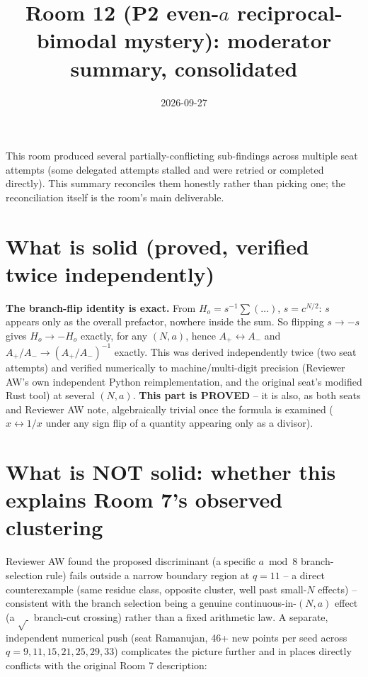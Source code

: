 \documentclass[11pt]{article}
\title{Room 12 (P2 even-$a$ reciprocal-bimodal mystery): moderator summary, consolidated}
\date{2026-09-27}
\begin{document}
\maketitle

\noindent This room produced several partially-conflicting sub-findings across multiple seat
attempts (some delegated attempts stalled and were retried or completed directly). This summary
reconciles them honestly rather than picking one; the reconciliation itself is the room's main
deliverable.

\section*{What is solid (proved, verified twice independently)}

\textbf{The branch-flip identity is exact.} From $H_o=s^{-1}\sum(\ldots)$, $s=c^{N/2}$: $s$
appears only as the overall prefactor, nowhere inside the sum. So flipping $s\to-s$ gives
$H_o\to-H_o$ exactly, for any $(N,a)$, hence $A_+\leftrightarrow A_-$ and
$A_+/A_-\to(A_+/A_-)^{-1}$ exactly. This was derived independently twice (two seat attempts) and
verified numerically to machine/multi-digit precision (Reviewer AW's own independent Python
reimplementation, and the original seat's modified Rust tool) at several $(N,a)$. \textbf{This part
is PROVED} -- it is also, as both seats and Reviewer AW note, algebraically trivial once the formula
is examined ($x\leftrightarrow1/x$ under any sign flip of a quantity appearing only as a divisor).

\section*{What is NOT solid: whether this explains Room 7's observed clustering}

Reviewer AW found the proposed discriminant (a specific $a\bmod8$ branch-selection rule) fails
outside a narrow boundary region at $q=11$ -- a direct counterexample (same residue class, opposite
cluster, well past small-$N$ effects) -- consistent with the branch selection being a genuine
continuous-in-$(N,a)$ effect (a $\sqrt{\ }$ branch-cut crossing) rather than a fixed arithmetic law.
A separate, independent numerical push (seat Ramanujan, 46+ new points per seed across $q=9,11,15,
21,25,29,33$) complicates the picture further and in places directly conflicts with the original
Room 7 description:
\end{document}

